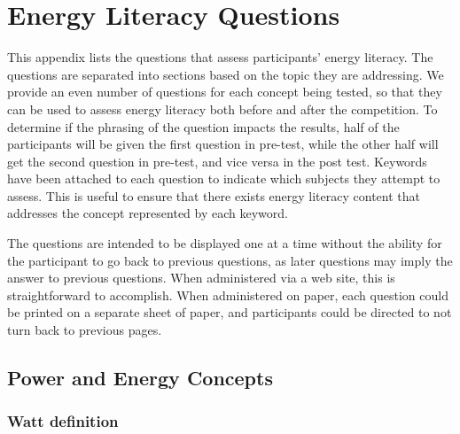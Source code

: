
\appendix
\chapter{Energy Literacy Questions}
\label{app:energy-literacy}

This appendix lists the questions that assess participants' energy literacy. The questions are separated into sections based on the topic they are addressing. We provide an even number of questions for each concept being tested, so that they can be used to assess energy literacy both before and after the competition. To determine if the phrasing of the question impacts the results, half of the participants will be given the first question in pre-test, while the other half will get the second question in pre-test, and vice versa in the post test. Keywords have been attached to each question to indicate which subjects they attempt to assess. This is useful to ensure that there exists energy literacy content that addresses the concept represented by each keyword.

The questions are intended to be displayed one at a time without the ability for the participant to go back to previous questions, as later questions may imply the answer to previous questions. When administered via a web site, this is straightforward to accomplish. When administered on paper, each question could be printed on a separate sheet of paper, and participants could be directed to not turn back to previous pages.

\section{Power and Energy Concepts}

\subsection{Watt definition}


